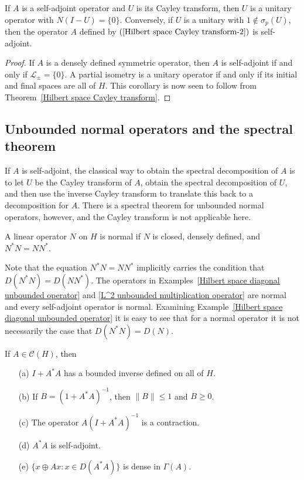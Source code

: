 \begin{corollary}
If $A$ is a self-adjoint operator and $U$ is its Cayley transform, then $U$ is a unitary operator with $N(I-U)=\{0\}$. Conversely, if $U$ is a unitary with $1\notin\sigma_p(U)$, then the operator $A$ defined by $(\ref{Hilbert space Cayley transform-2})$ is self-adjoint.
\end{corollary}
\begin{proof}
If $A$ is a densely defined symmetric operator, then $A$ is self-adjoint if and only if $\mathscr{L}_{\pm}=\{0\}$. A partial isometry is a unitary operator if and only if its initial and final spaces are all of $H$. This corollary is now seen to follow from Theorem~\ref{Hilbert space Cayley transform}.
\end{proof}
\subsection{Unbounded normal operators and the spectral theorem}
If $A$ is self-adjoint, the classical way to obtain the spectral decomposition of $A$ is to let $U$ be the Cayley transform of $A$, obtain the spectral decomposition of $U$, and then use the inverse Cayley transform to translate this back to a decomposition for $A$. There is a spectral theorem for unbounded normal operators, however, and the Cayley transform is not applicable here.
\begin{definition}
A linear operator $N$ on $H$ is normal if $N$ is closed, densely defined, and $N^*N=NN^*$.
\end{definition}
Note that the equation $N^*N=NN^*$ implicitly carries the condition that $D(N^*N)=D(NN^*)$. The operators in Examples~\ref{Hilbert space diagonal unbounded operator} and \ref{L^2 unbounded multiplication operator} are normal and every self-adjoint operator is normal. Examining Example~\ref{Hilbert space diagonal unbounded operator} it is easy to see that for a normal operator it is not necessarily the case that $D(N^*N)=D(N)$.
\begin{proposition}\label{Hilbert space unbounded operator A^*A}
If $A\in\mathcal{C}(H)$, then
\begin{itemize}
\item[(a)] $I+A^*A$ has a bounded inverse defined on all of $H$.
\item[(b)] If $B=(1+A^*A)^{-1}$, then $\|B\|\leq 1$ and $B\geq 0$.
\item[(c)] The operator $A(I+A^*A)^{-1}$ is a contraction.
\item[(d)] $A^*A$ is self-adjoint.
\item[(e)] $\{x\oplus Ax:x\in D(A^*A)\}$ is dense in $\Gamma(A)$. 
\end{itemize}
\end{proposition}
